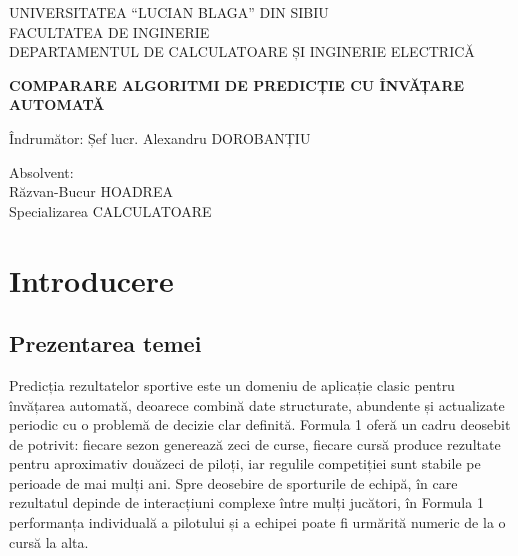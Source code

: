 \documentclass[12pt,a4paper]{report}
\begin{document}
\begin{titlepage}
\thispagestyle{empty}

\begin{center}

\vspace*{0.5cm}

\vspace{0.6cm}

UNIVERSITATEA ``LUCIAN BLAGA'' DIN SIBIU\\
FACULTATEA DE INGINERIE\\
DEPARTAMENTUL DE CALCULATOARE ȘI INGINERIE ELECTRICĂ

\vspace{7.5cm}

{\LARGE \textbf{COMPARARE ALGORITMI DE PREDICȚIE CU ÎNVĂȚARE AUTOMATĂ}}

\end{center}

\vspace{3cm}

\noindent
\begin{minipage}{0.75\textwidth}
Îndrumător: Șef lucr. Alexandru DOROBANȚIU
\end{minipage}

\vspace{2.5cm}

\hspace*{8.2cm}
\begin{minipage}{0.45\textwidth}
Absolvent:\\
Răzvan-Bucur HOADREA\\
Specializarea CALCULATOARE
\end{minipage}

\vfill

\end{titlepage}

\endgroup
\restoregeometry

\setcounter{page}{1}
\pagestyle{plain}

\tableofcontents

\chapter{Introducere}
\label{cap:introducere}

\section{Prezentarea temei}

Predicția rezultatelor sportive este un domeniu de aplicație clasic pentru învățarea
automată, deoarece combină date structurate, abundente și actualizate periodic cu o
problemă de decizie clar definită. Formula 1 oferă un cadru deosebit de potrivit: fiecare
sezon generează zeci de curse, fiecare cursă produce rezultate pentru aproximativ douăzeci
de piloți, iar regulile competiției sunt stabile pe perioade de mai mulți ani. Spre
deosebire de sporturile de echipă, în care rezultatul depinde de interacțiuni complexe între
mulți jucători, în Formula 1 performanța individuală a pilotului și a echipei poate fi
urmărită numeric de la o cursă la alta.
\end{document}
